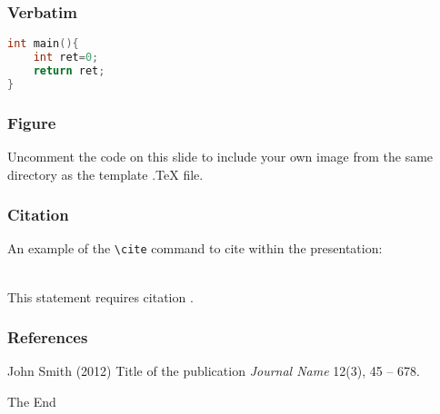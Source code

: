 \documentclass{beamer}
\begin{document}
\begin{frame}[fragile] %
\frametitle{Verbatim}
\begin{example}
\begin{lstlisting}[language = C]
int main(){
	int ret=0;
	return ret;
}
\end{lstlisting}
\end{example}
\end{frame}

\begin{frame}[fragile]
\frametitle{Figure}
Uncomment the code on this slide to include your own image from the same directory as the template .TeX file.
\end{frame}

\begin{frame}[fragile] %
\frametitle{Citation}
An example of the \verb|\cite| command to cite within the presentation:\\~

This statement requires citation \cite{p1}.
\end{frame}

\begin{frame}[fragile]
\frametitle{References}
\footnotesize{
\begin{thebibliography}{99} %
 John Smith (2012)
\newblock Title of the publication
\newblock \emph{Journal Name} 12(3), 45 -- 678.
\end{thebibliography}
}
\end{frame}

\begin{frame}[fragile]
\Huge{\centerline{The End}}
\end{frame}
\end{document}
